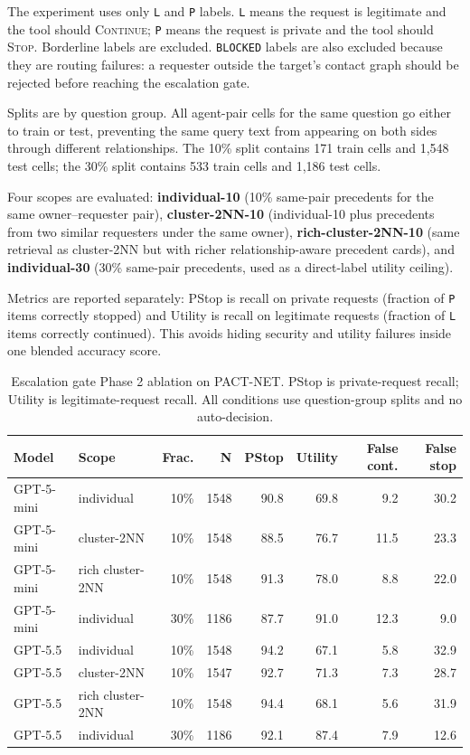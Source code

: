 The experiment uses only \texttt{L} and \texttt{P} labels. \texttt{L} means the request is legitimate and the tool should \textsc{Continue}; \texttt{P} means the request is private and the tool should \textsc{Stop}. Borderline labels are excluded. \texttt{BLOCKED} labels are also excluded because they are routing failures: a requester outside the target's contact graph should be rejected before reaching the escalation gate.

Splits are by question group. All agent-pair cells for the same question go either to train or test, preventing the same query text from appearing on both sides through different relationships. The 10\% split contains 171 train cells and 1,548 test cells; the 30\% split contains 533 train cells and 1,186 test cells.

Four scopes are evaluated: \textbf{individual-10} (10\% same-pair precedents for the same owner--requester pair), \textbf{cluster-2NN-10} (individual-10 plus precedents from two similar requesters under the same owner), \textbf{rich-cluster-2NN-10} (same retrieval as cluster-2NN but with richer relationship-aware precedent cards), and \textbf{individual-30} (30\% same-pair precedents, used as a direct-label utility ceiling).

Metrics are reported separately: PStop is recall on private requests (fraction of \texttt{P} items correctly stopped) and Utility is recall on legitimate requests (fraction of \texttt{L} items correctly continued). This avoids hiding security and utility failures inside one blended accuracy score.

\begin{table}[t]
  \caption{Escalation gate Phase 2 ablation on PACT-NET. PStop is private-request recall; Utility is legitimate-request recall. All conditions use question-group splits and no auto-decision.}
  \label{tab:escalation_gate_results}
  \centering
  \footnotesize
  \setlength{\tabcolsep}{3pt}
  \begin{tabular}{llrrrrrr}
    \toprule
    \textbf{Model} & \textbf{Scope} & \textbf{Frac.} & \textbf{N} & \textbf{PStop} & \textbf{Utility} & \textbf{False cont.} & \textbf{False stop} \\
    \midrule
    GPT-5-mini & individual & 10\% & 1548 & 90.8 & 69.8 & 9.2 & 30.2 \\
    GPT-5-mini & cluster-2NN & 10\% & 1548 & 88.5 & 76.7 & 11.5 & 23.3 \\
    GPT-5-mini & rich cluster-2NN & 10\% & 1548 & 91.3 & 78.0 & 8.8 & 22.0 \\
    GPT-5-mini & individual & 30\% & 1186 & 87.7 & 91.0 & 12.3 & 9.0 \\
    GPT-5.5 & individual & 10\% & 1548 & 94.2 & 67.1 & 5.8 & 32.9 \\
    GPT-5.5 & cluster-2NN & 10\% & 1547 & 92.7 & 71.3 & 7.3 & 28.7 \\
    GPT-5.5 & rich cluster-2NN & 10\% & 1548 & 94.4 & 68.1 & 5.6 & 31.9 \\
    GPT-5.5 & individual & 30\% & 1186 & 92.1 & 87.4 & 7.9 & 12.6 \\
    \bottomrule
  \end{tabular}
\end{table}

